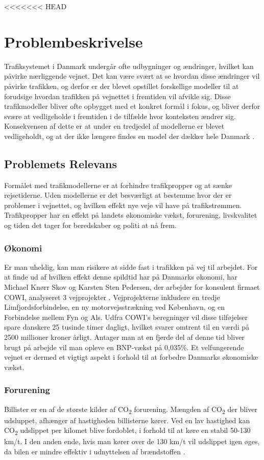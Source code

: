 <<<<<<< HEAD
\chapter{Problembeskrivelse}
Trafiksystemet i Danmark undergår ofte udbygninger og ændringer, hvilket kan påvirke nærliggende vejnet. Det kan være svært at se hvordan disse ændringer vil påvirke trafikken, og derfor er der blevet opstillet forskellige modeller til at forudsige hvordan trafikken på vejnettet i fremtiden vil afvikle sig. Disse trafikmodeller bliver ofte opbygget med et konkret formål i fokus, og bliver derfor svære at vedligeholde i fremtiden i de tilfælde hvor konteksten ændrer sig. Konsekvensen af dette er at under en tredjedel af modellerne er blevet vedligeholdt, og at der ikke længere findes en model der dækker hele Danmark \cite[s. 1-2]{dtfnotat}.
\section{Problemets Relevans}
Formålet med trafikmodellerne er at forhindre trafikpropper og at sænke rejsetiderne. Uden modellerne er det besværligt at bestemme hvor der er problemer i vejnettet, og hvilken effekt nye veje vil have på trafikstrømmen. Trafikpropper har en effekt på landets økonomiske vækst, forurening, livskvalitet og tiden det tager for beredskaber og politi at nå frem.

\subsection{Økonomi}
Er man uheldig, kan man risikere at sidde fast i trafikken på vej til arbejdet. For at finde ud af hvilken effekt denne spildtid har på Danmarks økonomi, har Michael Knørr Skov og Karsten Sten Pedersen, der arbejder for konsulent firmaet COWI, analyseret 3 vejprojekter \cite{trafikoekonomi}. Vejprojekterne inkludere en tredje Limfjordsforbindelse, en ny motorvejsstrækning ved København, og en Forbindelse mellem Fyn og Als. Udfra COWI’s beregninger vil disse tilføjelser spare danskere 25 tusinde timer dagligt, hvilket svarer omtrent til en værdi på 2500 millioner kroner årligt. Antager man at en fjerde del af denne tid bliver brugt på arbejde vil man opleve en BNP-vækst på 0,035\%. Et velfungerende vejnet er dermed et vigtigt aspekt i forhold til at forbedre Danmarks økonomiske vækst.

\subsection{Forurening}
Billister er en af de største kilder af CO\textsubscript{2} forurening. Mængden af CO\textsubscript{2} der bliver udsluppet, afhænger af hastigheden billisterne kører. Ved en lav hastighed kan CO\textsubscript{2} udslippet per kilomet blive fordoblet, i forhold til at køre en stabil 50-130 km/t. I den anden ende, hvis man kører over de 130 km/t vil udslippet igen øges, da bilen er mindre effektiv i udnyttelsen af brændstoffen \cite[s. 5-6]{forurening}.

